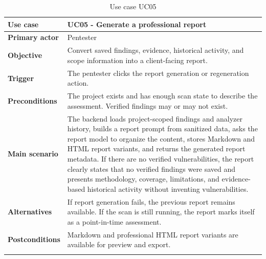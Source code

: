 \documentclass[12pt,a4paper]{report}
\begin{document}
\begin{longtable}{|p{}|p{}|}
\hline
\textbf{Use case} & UC05 - Generate a professional report \\
\hline
\textbf{Primary actor} & Pentester \\
\hline
\textbf{Objective} & Convert saved findings, evidence, historical activity, and
scope information into a client-facing report. \\
\hline
\textbf{Trigger} & The pentester clicks the report generation or regeneration action. \\
\hline
\textbf{Preconditions} & The project exists and has enough scan state to describe the
assessment. Verified findings may or may not exist. \\
\hline
\textbf{Main scenario} &
The backend loads project-scoped findings and analyzer history, builds a report prompt
from sanitized data, asks the report model to organize the content, stores Markdown and
HTML report variants, and returns the generated report metadata. If there are no
verified vulnerabilities, the report clearly states that no verified findings were
saved and presents methodology, coverage, limitations, and evidence-based historical
activity without inventing vulnerabilities. \\
\hline
\textbf{Alternatives} & If report generation fails, the previous report remains
available. If the scan is still running, the report marks itself as a point-in-time
assessment. \\
\hline
\textbf{Postconditions} & Markdown and professional HTML report variants are available
for preview and export. \\
\hline
\caption{Use case UC05}
\label{tab:uc05}
\end{longtable}
\end{document}
